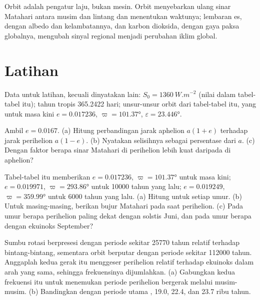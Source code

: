 Orbit adalah pengatur laju, bukan mesin. Orbit menyebarkan ulang sinar Matahari antara musim dan lintang
dan menentukan waktunya; lembaran es, dengan albedo dan kelambatannya, dan karbon dioksida, dengan
gaya paksa globalnya, mengubah sinyal regional menjadi perubahan iklim global.

\section*{Latihan}\label{sec:b2:orbital-forcing:exercises}

Data untuk latihan, kecuali dinyatakan lain: $S_0 = \qty{1360}{W.m^{-2}}$ (nilai dalam
tabel-tabel itu); tahun tropis \num{365.2422} hari; unsur-unsur orbit dari tabel-tabel itu, yang untuk masa kini
$e = 0.017236$, $\varpi = \ang{101.37}$, $\varepsilon = \ang{23.446}$.

\begin{exercise}[$\star$]\label{exo:b2:orbital-forcing:1}
Ambil $e = 0.0167$. (a) Hitung perbandingan jarak aphelion $a(1 + e)$ terhadap jarak
perihelion $a(1 - e)$. (b) Nyatakan selisihnya sebagai persentase dari $a$. (c) Dengan faktor berapa
sinar Matahari di perihelion lebih kuat daripada di aphelion?
\end{exercise}

\begin{exercise}[$\star$]\label{exo:b2:orbital-forcing:2}
Tabel-tabel itu memberikan $e = 0.017236$, $\varpi = \ang{101.37}$ untuk masa kini; $e = 0.019971$, $\varpi =
\ang{293.86}$ untuk \num{10000} tahun yang lalu; $e = 0.019249$, $\varpi = \ang{359.99}$ untuk \num{6000} tahun yang lalu.
(a) Hitung  untuk setiap umur. (b) Untuk masing-masing, berikan bujur Matahari pada saat
perihelion. (c) Pada umur berapa perihelion paling dekat dengan solstis Juni, dan pada umur berapa dengan
ekuinoks September?
\end{exercise}

\begin{exercise}[$\star$]\label{exo:b2:orbital-forcing:3}
Sumbu rotasi berpresesi dengan periode sekitar \num{25770} tahun relatif terhadap bintang-bintang, sementara
orbit berputar dengan periode sekitar \num{112000} tahun. Anggaplah kedua gerak itu menggeser
perihelion relatif terhadap ekuinoks dalam arah yang sama, sehingga frekuensinya dijumlahkan. (a) Gabungkan
kedua frekuensi itu untuk menemukan periode perihelion
bergerak melalui musim-musim. (b) Bandingkan dengan periode utama , \num{19.0},
\num{22.4}, dan \num{23.7} ribu tahun.
\end{exercise}

